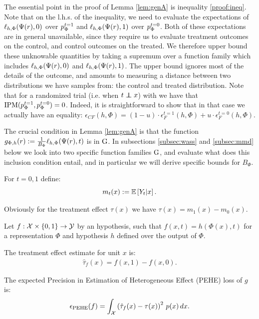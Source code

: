 The essential point in the proof of Lemma \ref{lem:genA} is inequality \ref{proof:ineq}. Note that on the l.h.s. of the inequality, we need to evaluate the expectations of $ \ell_{h,\Phi}(\Psi(r),0)$ over $p^{t=1}_\Phi$ and $\ell_{h,\Phi}(\Psi(r),1)$ over $p^{t=0}_\Phi$. Both of these expectations are in general unavailable, since they require us to evaluate treatment outcomes on the control, and control outcomes on the treated. We therefore upper bound these unknowable quantities by taking a supremum over a function family which includes $\ell_{h,\Phi}(\Psi(r),0)$ and $\ell_{h,\Phi}(\Psi(r),1)$. The upper bound ignores most of the details of the outcome, and amounts to measuring a distance between two distributions we have samples from: the control and treated distribution. Note that for a randomized trial (i.e. when $t \indep x$) with we have that $\text{IPM}(p^{t=1}_\Phi,p^{t=0}_\Phi) = 0$. Indeed, it is straightforward to show that in that case we actually have an equality: $\epsilon_{CF}(h,\Phi) = (1-u)\cdot \epsilon^{t=1}_{F}(h,\Phi) + u\cdot  \epsilon^{t=0}_{F}(h,\Phi)$.


The crucial condition in Lemma \ref{lem:genA} is that the function $g_{\Phi,h}(r) := \frac{1}{B_\Phi} \ell_{h,\Phi}(\Psi(r),t)$ is in $\mathrm{G}$. In subsections \ref{subsec:wass} and \ref{subsec:mmd} below we look into two specific function families $\mathrm{G}$, and evaluate what does this inclusion condition entail, and in particular we will derive specific bounds for $B_\Phi$.



\begin{thmappdef}\label{def:m}
For $t=0,1$ define:
$$m_t(x) := \mathbb{E}\left[Y_t|x\right].$$
\end{thmappdef}
Obviously for the treatment effect $\tau(x)$ we have $\tau(x) = m_1(x)-m_0(x)$.


Let $f: \mathcal X \times \{0,1\} \rightarrow \mathcal Y$ by an hypothesis, such that $f(x,t) = h(\Phi(x),t)$ for a representation $\Phi$ and hypothesis $h$ defined over the output of $\Phi$.
\begin{thmappdef}\label{def:inditeerrA}
The treatment effect estimate for unit $x$ is:
\begin{align*}
\hat{\tau}_f  (x) = f(x,1) - f(x,0).
\end{align*}
\end{thmappdef}


\begin{thmappdef}
 The expected Precision in Estimation of Heterogeneous Effect (PEHE) loss of $g$ is:
$$\epsilon_{\text{PEHE}}(f) = \int_{\mathcal X } \left( \hat{\tau}_f(x) - \tau(x) \right)^2 \, p(x) \, dx .$$
\end{thmappdef}


